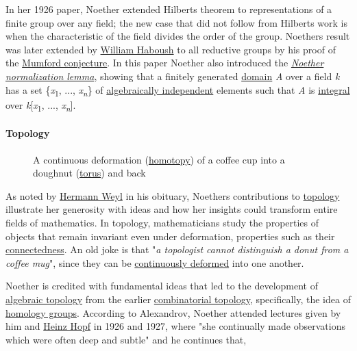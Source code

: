 In her 1926 paper, Noether extended Hilbert\textquotesingle s theorem to representations of a finite group over any field; the new case that did not follow from Hilbert\textquotesingle s work is when the characteristic of the field divides the order of the group. Noether\textquotesingle s result was later extended by \href{https://en.wikipedia.org/wiki/William_Haboush}{William Haboush} to all reductive groups by his proof of the \href{https://en.wikipedia.org/wiki/Haboush's_theorem}{Mumford conjecture}. In this paper Noether also introduced the \emph{\href{https://en.wikipedia.org/wiki/Noether_normalization_lemma}{Noether normalization lemma}}, showing that a finitely generated \href{https://en.wikipedia.org/wiki/Integral_domain}{domain} {\emph{A}} over a field {\emph{k}} has a set {\{\emph{x}\textsubscript{1}, ..., \emph{x}\textsubscript{\emph{n}}}\} of \href{https://en.wikipedia.org/wiki/Algebraically_independent}{algebraically independent} elements such that {\emph{A}} is \href{https://en.wikipedia.org/wiki/Integrality}{integral} over {\emph{k}{[}\emph{x}\textsubscript{1}, ..., \emph{x}\textsubscript{\emph{n}}{]}}.


\paragraph{Topology}\label{Topology}

\begin{figure}
\centering
\href{https://en.wikipedia.org/wiki/File:Mug_and_Torus_morph.gif}{}
\caption{A continuous deformation (\href{https://en.wikipedia.org/wiki/Homotopy}{homotopy}) of a coffee cup into a doughnut (\href{https://en.wikipedia.org/wiki/Torus}{torus}) and back}\label{mwB6E}
\end{figure}

As noted by \href{https://en.wikipedia.org/wiki/Hermann_Weyl}{Hermann Weyl} in his obituary, Noether\textquotesingle s contributions to \href{https://en.wikipedia.org/wiki/Topology}{topology} illustrate her generosity with ideas and how her insights could transform entire fields of mathematics. In topology, mathematicians study the properties of objects that remain invariant even under deformation, properties such as their \href{https://en.wikipedia.org/wiki/Connected_space}{connectedness}. An old joke is that "\emph{a topologist cannot distinguish a donut from a coffee mug}", since they can be \href{https://en.wikipedia.org/wiki/Homeomorphism}{continuously deformed} into one another.

Noether is credited with fundamental ideas that led to the development of \href{https://en.wikipedia.org/wiki/Algebraic_topology}{algebraic topology} from the earlier \href{https://en.wikipedia.org/wiki/Combinatorial_topology}{combinatorial topology}, specifically, the idea of \href{https://en.wikipedia.org/wiki/Homology_theory\#Towards_algebraic_topology}{homology groups}. According to Alexandrov, Noether attended lectures given by him and \href{https://en.wikipedia.org/wiki/Heinz_Hopf}{Heinz Hopf} in 1926 and 1927, where "she continually made observations which were often deep and subtle" and he continues that,

